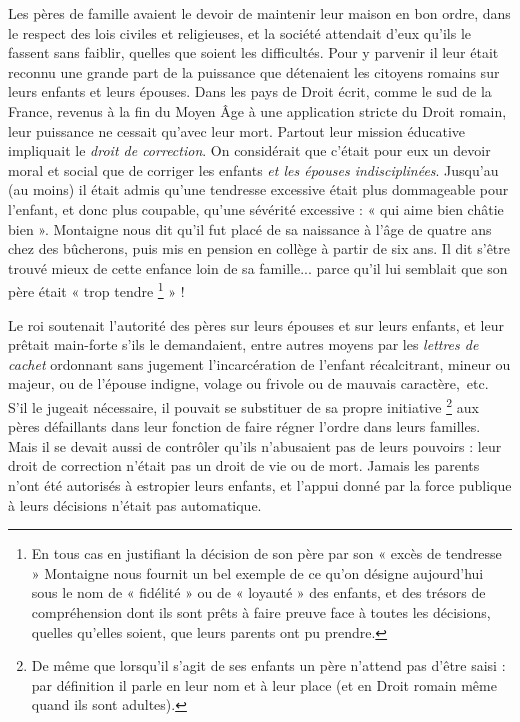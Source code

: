 Les pères de famille avaient le devoir de maintenir leur maison en bon ordre, dans le respect des lois civiles et religieuses, et la société attendait d'eux qu'ils le fassent sans faiblir, quelles que soient les difficultés. Pour y parvenir il leur était reconnu une grande part de la puissance que détenaient les citoyens romains sur leurs enfants et leurs épouses. Dans les pays de Droit écrit, comme le sud de la France, revenus à la fin du Moyen Âge à une application stricte du Droit romain, leur puissance ne cessait qu'avec leur mort. Partout leur mission éducative impliquait le \emph{droit de correction}. On considérait que c'était pour eux un devoir moral et social que de corriger les enfants \emph{et les épouses indisciplinées}. Jusqu'au  (au moins) il était admis qu'une tendresse excessive était plus dommageable pour l'enfant, et donc plus coupable, qu'une sévérité excessive : « {qui aime bien châtie bien} ». Montaigne nous dit qu'il fut placé de sa naissance à l'âge de quatre ans chez des bûcherons, puis mis en pension en collège à partir de six ans. Il dit s'être trouvé mieux de cette enfance loin de sa famille... parce qu'il lui semblait que son père était « trop tendre%
\footnote{En tous cas en justifiant la décision de son père par son « excès de tendresse » Montaigne nous fournit un bel exemple de ce qu'on désigne aujourd'hui sous le nom de « fidélité » ou de « loyauté » des enfants, et des trésors de compréhension dont ils sont prêts à faire preuve face à toutes les décisions, quelles qu'elles soient, que leurs parents ont pu prendre.} 
» !

 Le roi soutenait l'autorité des pères sur leurs épouses et sur leurs enfants, et leur prêtait main-forte s'ils le demandaient, entre autres moyens par les \emph{lettres de cachet} ordonnant sans jugement l'incarcération de l'enfant récalcitrant, mineur ou majeur, ou de l'épouse indigne, volage ou frivole ou de mauvais caractère,~etc. S'il le jugeait nécessaire, il pouvait se substituer de sa propre initiative%
\footnote{De même que lorsqu'il s'agit de ses enfants un père n'attend pas d'être saisi : par définition il parle en leur nom et à leur place (et en Droit romain même quand ils sont adultes).} 
aux pères défaillants dans leur fonction de faire régner l'ordre dans leurs familles. 
 Mais il se devait aussi de contrôler qu'ils n'abusaient pas de leurs pouvoirs : leur droit de correction n'était pas un droit de vie ou de mort. Jamais les parents n'ont été autorisés à estropier leurs enfants, et l'appui donné par la force publique à leurs décisions n'était pas automatique.

